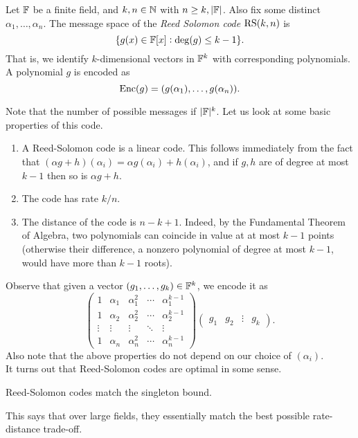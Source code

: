 		\begin{fdef}
			Let $\mathbb{F}$ be a finite field, and $k,n \in \mathbb{N}$ with $n \ge k,|\mathbb{F}|$. Also fix some distinct $\alpha_1,\ldots,\alpha_n$. The message space of the \emph{Reed Solomon code} $\operatorname{RS}(k,n)$ is
			\[ \{ g(x) \in \mathbb{F}[x] : \deg(g) \le k-1 \}. \]
			That is, we identify $k$-dimensional vectors in $\mathbb{F}^k$ with corresponding polynomials.
			A polynomial $g$ is encoded as
			\[ \operatorname{Enc}(g) = ( g(\alpha_1),\ldots,g(\alpha_n) ). \]
		\end{fdef}
		Note that the number of possible messages if $|\mathbb{F}|^k$. Let us look at some basic properties of this code.
		\begin{enumerate}
			\item A Reed-Solomon code is a linear code. This follows immediately from the fact that $(\alpha g+h)(\alpha_i) = \alpha g(\alpha_i) + h(\alpha_i)$, and if $g,h$ are of degree at most $k-1$ then so is $\alpha g + h$.
			\item The code has rate $k/n$.
			\item The distance of the code is $n-k+1$. Indeed, by the Fundamental Theorem of Algebra, two polynomials can coincide in value at at most $k-1$ points (otherwise their difference, a nonzero polynomial of degree at most $k-1$, would have more than $k-1$ roots).
		\end{enumerate}
		Observe that given a vector $(g_1,\ldots,g_k) \in \mathbb{F}^k$, we encode it as
		\[ \begin{pmatrix} 1 & \alpha_1 & \alpha_1^2 & \cdots & \alpha_1^{k-1} \\ 1 & \alpha_2 & \alpha_2^2 & \cdots & \alpha_2^{k-1} \\ \vdots & \vdots & \vdots & \ddots & \vdots \\ 1 & \alpha_n & \alpha_n^2 & \cdots & \alpha_n^{k-1} \end{pmatrix} \begin{pmatrix} g_1 & g_2 & \vdots & g_k \end{pmatrix}. \]
		Also note that the above properties do not depend on our choice of $(\alpha_i)$.\\

		It turns out that Reed-Solomon codes are optimal in some sense.
		\begin{ftheo}%
			Reed-Solomon codes match the singleton bound.
		\end{ftheo}
		This says that over large fields, they essentially match the best possible rate-distance trade-off.

